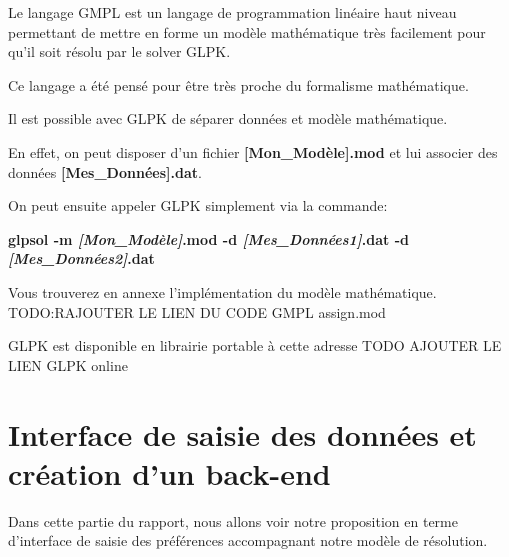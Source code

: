 \documentclass[final,poster]{polytech/polytech}
\begin{document}
Le langage GMPL est un langage de programmation linéaire haut niveau permettant de mettre en forme un modèle mathématique très facilement pour qu'il soit résolu par le solver GLPK.

Ce langage a été pensé pour être très proche du formalisme mathématique.

Il est possible avec GLPK de séparer données et modèle mathématique. 

En effet, on peut disposer d'un fichier \textbf{[Mon\_Modèle].mod} et lui associer des données \textbf{[Mes\_Données].dat}.

On peut ensuite appeler GLPK simplement via la commande:
\begin{center}
\textbf{glpsol -m \textit{[Mon\_Modèle]}.mod -d \textit{[Mes\_Données1]}.dat -d \textit{[Mes\_Données2]}.dat}
\end{center}

Vous trouverez en annexe  l'implémentation du modèle mathématique. TODO:RAJOUTER LE LIEN DU CODE GMPL assign.mod

GLPK est disponible en librairie portable à cette adresse TODO AJOUTER LE LIEN GLPK online

\section{Interface de saisie des données et création d'un back-end}
Dans cette partie du rapport, nous allons voir notre proposition en terme d'interface de saisie des préférences accompagnant notre modèle de résolution.
\end{document}
